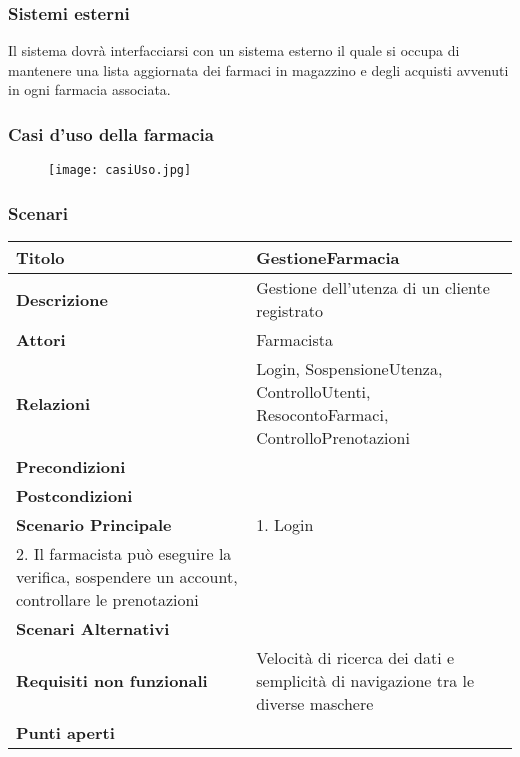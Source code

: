\subsubsection{Sistemi esterni}

Il sistema dovrà interfacciarsi con un sistema esterno il quale si occupa di
mantenere una lista aggiornata dei farmaci in magazzino e degli
acquisti avvenuti in ogni farmacia associata.


\newpage %
\subsubsection{Casi d'uso della farmacia}

\begin{figure}[h!]
  \begin{center}
      \texttt{[image: casiUso.jpg]}
  \end{center}
\end{figure}

\newpage %
\subsubsection{Scenari}
\hfill \break

\begin{tabular} {|P{4.5cm}|P{12.5cm}|}
\hline  
  \textbf{Titolo} & GestioneFarmacia \\
\hline
  \textbf{Descrizione} & Gestione dell'utenza di un cliente registrato \\
\hline
  \textbf{Attori} & Farmacista\\
\hline
  \textbf{Relazioni} & Login, SospensioneUtenza, ControlloUtenti, ResocontoFarmaci, ControlloPrenotazioni\\
\hline
  \textbf{Precondizioni} & \\
\hline
  \textbf{Postcondizioni} & \\
\hline
  \textbf{Scenario Principale} & 1. Login \\ 2. Il farmacista può eseguire la verifica, sospendere un account, controllare le prenotazioni \\
\hline
  \textbf{Scenari Alternativi} &\\
\hline
  \textbf{Requisiti non funzionali} & Velocità di ricerca dei dati e semplicità di navigazione tra le diverse maschere\\
\hline
  \textbf{Punti aperti} &\\
\hline
\end{tabular}
\hfill
\break

